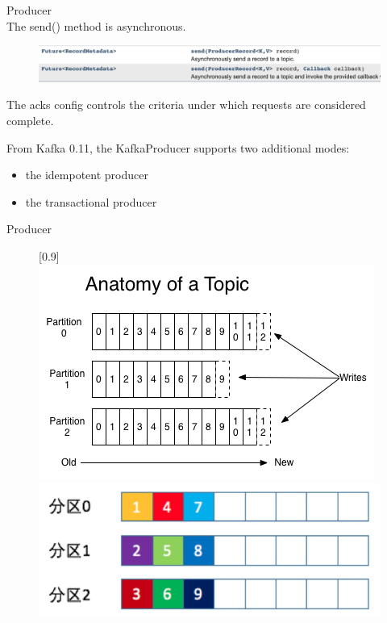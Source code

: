 \begin{frame}[plain,t]{Producer} %
     \\
    \vspace{2ex}
    The send() method is asynchronous.
    \begin{figure}
        \centering
        \includegraphics[width=0.8\linewidth]{image/0204}
        \label{fig:0204}
    \end{figure}

The acks config controls the criteria under which requests are considered complete.

\vspace{2ex}
 From Kafka 0.11, the KafkaProducer supports two additional modes: 
\begin{itemize}
    \item  the idempotent producer
    \item the transactional producer
\end{itemize}
\end{frame}
\begin{frame}[plain,t]{Producer} %
     \\
    \vspace{2ex}
   

    \begin{figure}
        \centering
        [0.9\linewidth]{
            \includegraphics[width=0.48\linewidth]{image/0102}\quad
            \includegraphics[width=0.48\linewidth]{image/0105}
        }

        \label{fig:0102}
    \end{figure}
\end{frame}

